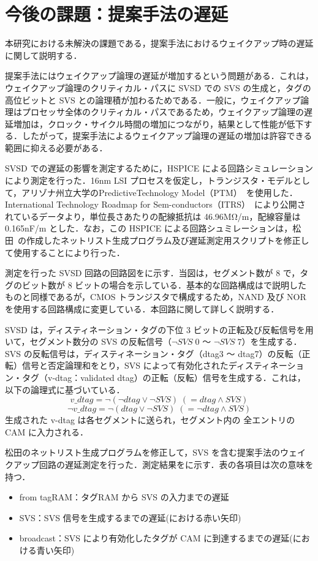 
\chapter{今後の課題：提案手法の遅延}
\label{sec:appendix3}
本研究における未解決の課題である，提案手法におけるウェイクアップ時の遅延に関して説明する．

提案手法にはウェイクアップ論理の遅延が増加するという問題がある．これは，ウェイクアップ論理のクリティカル・パスに SVSD での SVS の生成と，タグの高位ビットと SVS との論理積が加わるためである．一般に，ウェイクアップ論理はプロセッサ全体のクリティカル・パスであるため，ウェイクアップ論理の遅延増加は，クロック・サイクル時間の増加につながり，結果として性能が低下する．したがって，提案手法によるウェイクアップ論理の遅延の増加は許容できる範囲に抑える必要がある．

SVSD での遅延の影響を測定するために，HSPICE による回路シミュレーションにより測定を行った．16nm LSI プロセスを仮定し，トランジスタ・モデルとして，アリゾナ州立大学のPredictiveTechnology Model（PTM）~\cite{model2012}を使用した．International Technology Roadmap for Sem-conductors（ITRS）~\cite{itrs2012}により公開されているデータより，単位長さあたりの配線抵抗は 46.96MΩ/m，配線容量は 0.165nF/m とした．なお，この HSPICE による回路シュミレーションは，松田~\cite{matsuda-thesis}の作成したネットリスト生成プログラム及び遅延測定用スクリプトを修正して使用することにより行った． 

測定を行った SVSD 回路の回路図をに示す．当図は，セグメント数が 8 で，タグのビット数が 8 ビットの場合を示している．基本的な回路構成はで説明したものと同様であるが，CMOS トランジスタで構成するため，NAND 及び NOR を使用する回路構成に変更している．本回路に関して詳しく説明する．

SVSD は，ディスティネーション・タグの下位 3 ビットの正転及び反転信号を用いて，セグメント数分の SVS の反転信号（$\lnot SVS\;0$ 〜 $\lnot SVS\;7$）を生成する． SVS の反転信号は，ディスティネーション・タグ（dtag3 〜 dtag7）の反転（正転）信号と否定論理和をとり，SVS によって有効化されたディスティネーション・タグ（v-dtag：validated dtag）の正転（反転）信号を生成する．これは，以下の論理式に基づいている．
\[
  v\_dtag = \lnot (\lnot dtag \lor \lnot SVS) \; (= dtag \land SVS) 
\]
\[
  \lnot v\_dtag = \lnot (dtag \lor \lnot SVS) \; (= \lnot dtag \land SVS) 
\]
生成された v-dtag は各セグメントに送られ，セグメント内の 全エントリの CAM に入力される．

松田のネットリスト生成プログラムを修正して，SVS を含む提案手法のウェイクアップ回路の遅延測定を行った．測定結果をに示す．表の各項目は次の意味を持つ．
  \begin{itemize}
    \item from tagRAM：タグRAM から SVS  の入力までの遅延
    \item SVS：SVS 信号を生成するまでの遅延(における赤い矢印)
    \item broadcast：SVS により有効化したタグが CAM に到達するまでの遅延(における青い矢印) 
  \end{itemize}

